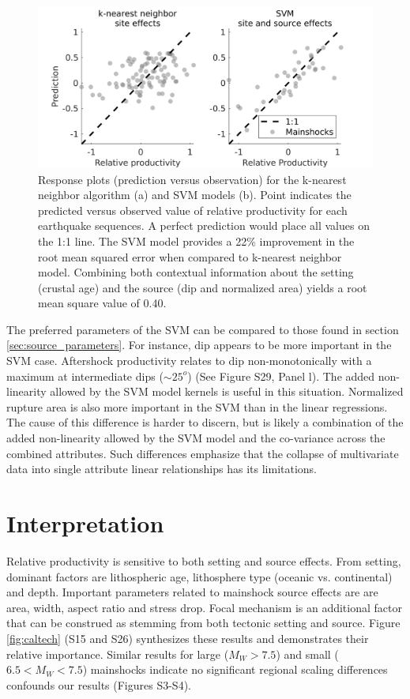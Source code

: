 \documentclass[draft, jgrga]{agujournal2018}
\begin{document}
    \begin{figure}
        \centering
        \includegraphics{response.png}
        \caption{Response plots (prediction versus observation) for the k-nearest neighbor algorithm (a) and SVM models (b). Point indicates the predicted versus observed value of relative productivity for each earthquake sequences. A perfect prediction would place all values on the 1:1 line. The SVM model provides a 22\% improvement in the root mean squared error when compared to k-nearest neighbor model. Combining both contextual information about the setting (crustal age) and the source (dip and normalized area) yields a root mean square value of 0.40.}
        \label{fig:response}
    \end{figure}

The preferred parameters of the SVM can be compared to those found in section \ref{sec:source_parameters}. For instance, dip appears to be more important in the SVM case. Aftershock productivity relates to dip non-monotonically with a maximum at intermediate  dips ($\sim 25^o$) (See Figure S29, Panel l). The added non-linearity allowed by the SVM model kernels is useful in this situation. Normalized rupture area is also more important in the SVM than in the linear regressions. The cause of this difference is harder to discern, but is likely a combination of the added non-linearity allowed by the SVM model and the co-variance across the combined attributes. Such differences emphasize that the collapse of multivariate data into single attribute linear relationships has its limitations.

\section{Interpretation}

Relative productivity is sensitive to both setting and source effects. From setting, dominant factors are lithospheric age, lithosphere type (oceanic vs. continental) and depth. Important parameters related to mainshock source effects are are area, width, aspect ratio and stress drop. Focal mechanism is an additional factor that can be construed as stemming from both tectonic setting and source. Figure \ref{fig:caltech} (S15 and S26) synthesizes these results and demonstrates their relative importance. Similar results for large ($M_W>7.5$) and small ($6.5<M_W<7.5$) mainshocks indicate no significant regional scaling differences confounds our results (Figures S3-S4).
\end{document}
